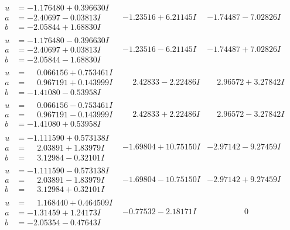 \documentclass[1p]{elsarticle_modified}
\theoremstyle{definition}
\begin{document}
$$\begin{array}{c|c|c}
\begin{aligned}
u &= -1.176480 + 0.396630 I \\
a &= -2.40697 - 0.03813 I \\
b &= -2.05844 + 1.68830 I\end{aligned}
 & -1.23516 + 6.21145 I & -1.74487 - 7.02826 I \\ \hline\begin{aligned}
u &= -1.176480 - 0.396630 I \\
a &= -2.40697 + 0.03813 I \\
b &= -2.05844 - 1.68830 I\end{aligned}
 & -1.23516 - 6.21145 I & -1.74487 + 7.02826 I \\ \hline\begin{aligned}
u &= \phantom{-}0.066156 + 0.753461 I \\
a &= \phantom{-}0.967191 + 0.143999 I \\
b &= -1.41080 - 0.53958 I\end{aligned}
 & \phantom{-}2.42833 - 2.22486 I & \phantom{-}2.96572 + 3.27842 I \\ \hline\begin{aligned}
u &= \phantom{-}0.066156 - 0.753461 I \\
a &= \phantom{-}0.967191 - 0.143999 I \\
b &= -1.41080 + 0.53958 I\end{aligned}
 & \phantom{-}2.42833 + 2.22486 I & \phantom{-}2.96572 - 3.27842 I \\ \hline\begin{aligned}
u &= -1.111590 + 0.573138 I \\
a &= \phantom{-}2.03891 + 1.83979 I \\
b &= \phantom{-}3.12984 - 0.32101 I\end{aligned}
 & -1.69804 + 10.75150 I & -2.97142 - 9.27459 I \\ \hline\begin{aligned}
u &= -1.111590 - 0.573138 I \\
a &= \phantom{-}2.03891 - 1.83979 I \\
b &= \phantom{-}3.12984 + 0.32101 I\end{aligned}
 & -1.69804 - 10.75150 I & -2.97142 + 9.27459 I \\ \hline\begin{aligned}
u &= \phantom{-}1.168440 + 0.464509 I \\
a &= -1.31459 + 1.24173 I \\
b &= -2.05354 - 0.47643 I\end{aligned}
 & -0.77532 - 2.18171 I & \phantom{-0.000000 } 0 \\ \hline\begin{aligned}

\end{aligned}
\end{array}$$
\end{document}
